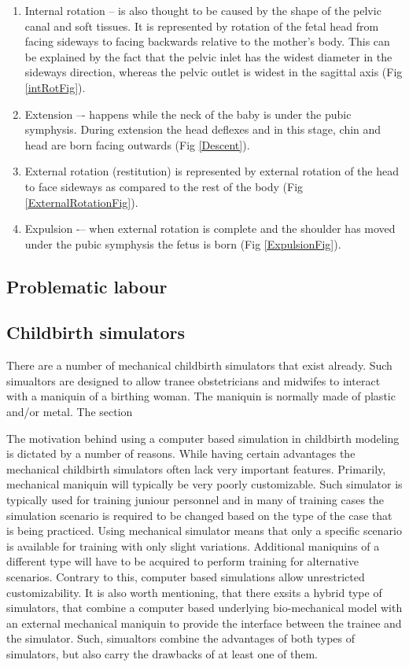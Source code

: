 \begin{enumerate}
\item Internal rotation – is also thought to be caused by the shape of the pelvic canal and soft tissues. It is represented by rotation of the fetal head from facing sideways to facing backwards relative to the mother's body. This can be explained by the fact that the pelvic inlet has the widest diameter in the sideways direction, whereas the pelvic outlet is widest in the sagittal axis (Fig \ref{intRotFig}).

\item Extension –- happens while the neck of the baby is under the pubic symphysis. During extension the head deflexes and in this stage, chin and head are born facing outwards (Fig \ref{Descent}).
\item External rotation (restitution) is represented by external rotation of the head to face sideways as compared to the rest of the body (Fig \ref{ExternalRotationFig}).

\item Expulsion -– when external rotation is complete and the shoulder has moved under the pubic symphysis the fetus is born (Fig \ref{ExpulsionFig}).

\end{enumerate}



\subsection{Problematic labour}

\subsection{Childbirth simulators}
There are a number of mechanical childbirth simulators that exist already. Such simualtors are designed to allow tranee obstetricians and midwifes to interact with a maniquin of a birthing woman. The maniquin is normally made of plastic and/or metal. The section

The motivation behind using a computer based simulation in childbirth modeling is dictated by a number of reasons. While having certain advantages the mechanical childbirth simulators often lack very important features. Primarily, mechanical maniquin will typically be very poorly customizable. Such simulator is typically used for training juniour personnel and in many of training cases the simulation scenario is required to be changed based on the type of the case that is being practiced. Using mechanical simulator means that only a specific scenario is available for training with only slight variations. Additional maniquins of a different type will have to be acquired to perform training for alternative scenarios. Contrary to this, computer based simulations allow unrestricted customizability. It is also worth mentioning, that there exsits a hybrid type of simulators, that combine a computer based underlying bio-mechanical model with an external mechanical maniquin to provide the interface between the trainee and the simulator. Such, simualtors combine the advantages of both types of simulators, but also carry the drawbacks of at least one of them.

